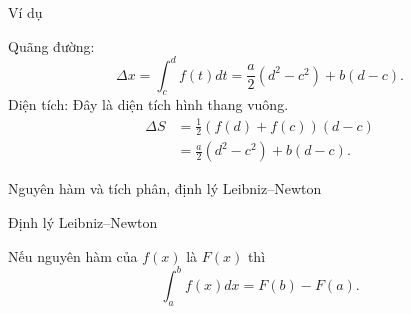 \begin{frame}{Ví dụ}
\begin{center}
\begin{minipage}{0.5\linewidth}
            Quãng đường: 
            \begin{equation*}
                \Delta x = \int_{c}^{d} f(t) dt = \frac{a}{2} (d^2-c^2) + b(d-c).
            \end{equation*}
            Diện tích: Đây là diện tích hình thang vuông.
            \begin{equation*}
            \begin{split}
                \Delta S &= \frac12 \left(f(d) + f(c)\right) (d-c) \\&=  \frac{a}{2} (d^2-c^2) + b(d-c).             
            \end{split}
            \end{equation*}
        \end{minipage}
    \end{center}
\end{frame}
\begin{frame}{Nguyên hàm và tích phân, định lý Leibniz–Newton}


    Định lý Leibniz–Newton

    \begin{mdframed}[backgroundcolor=BlueDefault!10, linecolor=BlueDefault, linewidth=1pt]
    Nếu nguyên hàm của \(f(x)\) là \(F(x)\) thì 
    \begin{equation}
        \int_{a}^{b} f(x) dx = F(b) - F(a).      
    \end{equation}
    \end{mdframed}
    

    
\end{frame}

